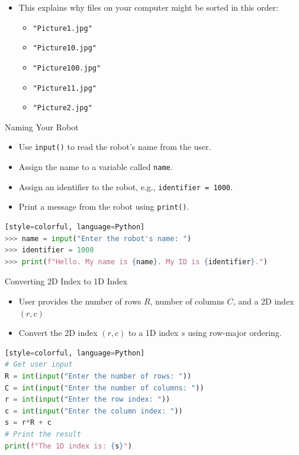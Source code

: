 \documentclass{beamer}
\begin{document}
\begin{frame}
    \begin{itemize}
        \item This explains why files on your computer might be sorted in this order:
        \begin{itemize}
            \item \texttt{"Picture1.jpg"}
            \item \texttt{"Picture10.jpg"}
            \item \texttt{"Picture100.jpg"}
            \item \texttt{"Picture11.jpg"}
            \item \texttt{"Picture2.jpg"}
        \end{itemize}
    \end{itemize}
\end{frame}


\begin{frame}[fragile]{Naming Your Robot}
    \begin{itemize}
        \item Use \texttt{input()} to read the robot's name from the user.
        \item Assign the name to a variable called \texttt{name}.
        \item Assign an identifier to the robot, e.g., \texttt{identifier = 1000}.
        \item Print a message from the robot using \texttt{print()}.
    \end{itemize}
    \begin{lstlisting}[style=colorful, language=Python][style=colorful, language=Python]
>>> name = input("Enter the robot's name: ")
>>> identifier = 1000
>>> print(f"Hello. My name is {name}. My ID is {identifier}.")
    \end{lstlisting}
\end{frame}

\begin{frame}[fragile]{Converting 2D Index to 1D Index}
    \begin{itemize}
        \item User provides the number of rows \(R\), number of columns \(C\), and a 2D index \((r, c)\)
        \item Convert the 2D index \((r, c)\) to a 1D index \(s\) using row-major ordering.
    \end{itemize}
    \begin{lstlisting}[style=colorful, language=Python][style=colorful, language=Python]
# Get user input
R = int(input("Enter the number of rows: "))
C = int(input("Enter the number of columns: "))
r = int(input("Enter the row index: "))
c = int(input("Enter the column index: "))
s = r*R + c
# Print the result
print(f"The 1D index is: {s}")
    \end{lstlisting}
\end{frame}
\end{document}
